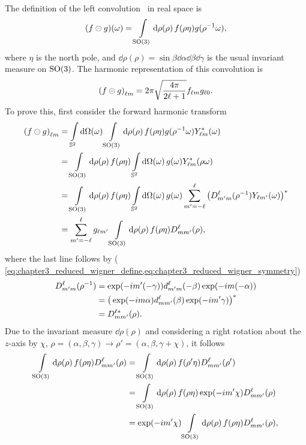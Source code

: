 The definition of the left convolution~\autocite{Kennedy2011,Driscoll1994} in real space is
%
\begin{equation}
	\pixel{(f \circleddash g)}
	= \integrateRotation{\rho} f(\rho\eta) g(\rho^{-1}\omega),
\end{equation}
%
where \({\eta}\) is the north pole, and \(\dd{\rho(\rho)}=\sin{\beta} \dd{\alpha} \dd{\beta} \dd{\gamma}\) is the usual invariant measure on \(\rotationGroup{}\).
The harmonic representation of this convolution is
%
\begin{equation}
	\harmonic{(f \circleddash g)}
	= 2\pi \sqrt{\inverseFactor} \harmonic{f} \axiHarmonic{g}.
\end{equation}
%
To prove this, first consider the forward harmonic transform
%
\begin{align}
	\harmonic{(f \circleddash g)}
	 & = \integrateSphere{\omega} \integrateRotation{\rho} f(\rho\eta) g(\rho^{-1}\omega) \pixel{\conj{\harmonic{Y}}} \nonumber{}                                                                 \\
	 & = \integrateRotation{\rho} f(\rho\eta) \integrateSphere{\omega} \pixel{g} \conj{\harmonic{Y}}(\rho\omega) \nonumber{}                                                                      \\
	 & = \integrateRotation{\rho} f(\rho\eta) \integrateSphere{\omega} \pixel{g} \sum\limits_{m'=-\ell}^{\ell} \conj{\big( \wigner{\ell}{m'}{m}(\rho^{-1}) \pixel{Y_{\ell m'}} \big)} \nonumber{} \\
	 & = \sum\limits_{m'=-\ell}^{\ell} g_{\ell m'} \integrateRotation{\rho} f(\rho\eta) \wigner{\ell}{m}{m'}(\rho),
\end{align}
%
where the last line follows by (\cf{} \cref{eq:chapter3_reduced_wigner_define,eq:chapter3_reduced_wigner_symmetry})
%
\begin{align}
	\wigner{\ell}{m'}{m} (\rho^{-1})
	 & = \exp(-i m'(-\gamma)) \reducedWigner{\ell}{m'}{m}(-\beta) \exp(-i m(-\alpha)) \nonumber{}           \\
	 & = \conj{\big(\exp(-i m\alpha) \reducedWigner{\ell}{m}{m'}(\beta) \exp(-i m'\gamma)\big)} \nonumber{} \\
	 & = \wigner[\ast]{\ell}{m}{m'}(\rho).
\end{align}
%
Due to the invariant measure \(\dd{\rho(\rho)}\) and considering a right rotation about the \(z\)-axis by \({\chi}\), \ie{} \(\rho = (\alpha,\beta,\gamma) \rightarrow \rho' = (\alpha,\beta,\gamma+\chi)\), it follows
%
\begin{align}\label{eq:chapter3_so3_integral}
	\integrateRotation{\rho} f(\rho\eta) \wigner{\ell}{m}{m'}(\rho)
	 & = \integrateRotation{\rho} f(\rho'\eta) \wigner{\ell}{m}{m'}(\rho') \nonumber{}               \\
	 & = \integrateRotation{\rho} f(\rho\eta) \exp(-i m'\chi) \wigner{\ell}{m}{m'}(\rho) \nonumber{} \\
	 & = \exp(-i m'\chi) \integrateRotation{\rho} f(\rho\eta) \wigner{\ell}{m}{m'}(\rho),
\end{align}
